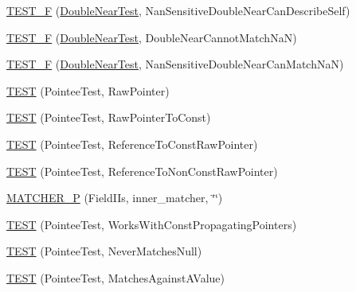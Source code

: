 \begin{DoxyCompactItemize}
\item 
\mbox{\hyperlink{namespacetesting_1_1gmock__matchers__test_ad147bef4b26c0a060cb4d25fe517a3e3}{T\+E\+S\+T\+\_\+F}} (\mbox{\hyperlink{namespacetesting_1_1gmock__matchers__test_aea537d0183ccc65b5c49a75d711993c8}{Double\+Near\+Test}}, Nan\+Sensitive\+Double\+Near\+Can\+Describe\+Self)
\item 
\mbox{\hyperlink{namespacetesting_1_1gmock__matchers__test_a9542b930e1de4d087a8655855edcc13c}{T\+E\+S\+T\+\_\+F}} (\mbox{\hyperlink{namespacetesting_1_1gmock__matchers__test_aea537d0183ccc65b5c49a75d711993c8}{Double\+Near\+Test}}, Double\+Near\+Cannot\+Match\+NaN)
\item 
\mbox{\hyperlink{namespacetesting_1_1gmock__matchers__test_a7c8d850697cb6cc030a4b05eeecffb72}{T\+E\+S\+T\+\_\+F}} (\mbox{\hyperlink{namespacetesting_1_1gmock__matchers__test_aea537d0183ccc65b5c49a75d711993c8}{Double\+Near\+Test}}, Nan\+Sensitive\+Double\+Near\+Can\+Match\+NaN)
\item 
\mbox{\hyperlink{namespacetesting_1_1gmock__matchers__test_ad6a13303d164fa9ca035a137840b78cb}{T\+E\+ST}} (Pointee\+Test, Raw\+Pointer)
\item 
\mbox{\hyperlink{namespacetesting_1_1gmock__matchers__test_a84a21ee7de697401049cb932f859ee33}{T\+E\+ST}} (Pointee\+Test, Raw\+Pointer\+To\+Const)
\item 
\mbox{\hyperlink{namespacetesting_1_1gmock__matchers__test_aebba40e49fe790490ba88984fdc7c7a6}{T\+E\+ST}} (Pointee\+Test, Reference\+To\+Const\+Raw\+Pointer)
\item 
\mbox{\hyperlink{namespacetesting_1_1gmock__matchers__test_a2d2296f6b23130be225b8df48746dfd5}{T\+E\+ST}} (Pointee\+Test, Reference\+To\+Non\+Const\+Raw\+Pointer)
\item 
\mbox{\hyperlink{namespacetesting_1_1gmock__matchers__test_a3d3f285bba1766bf9daf840a16e79924}{M\+A\+T\+C\+H\+E\+R\+\_\+P}} (Field\+I\+Is, inner\+\_\+matcher, \char`\"{}\char`\"{})
\item 
\mbox{\hyperlink{namespacetesting_1_1gmock__matchers__test_a9d851a5bb597fa45b5d1cf3f295398e8}{T\+E\+ST}} (Pointee\+Test, Works\+With\+Const\+Propagating\+Pointers)
\item 
\mbox{\hyperlink{namespacetesting_1_1gmock__matchers__test_ac778a9cebf9306a5efd27cc1186d8269}{T\+E\+ST}} (Pointee\+Test, Never\+Matches\+Null)
\item 
\mbox{\hyperlink{namespacetesting_1_1gmock__matchers__test_afe22e8230dc7a34498e4b2f91dcdd7cd}{T\+E\+ST}} (Pointee\+Test, Matches\+Against\+A\+Value)
\item 

\end{DoxyCompactItemize}
